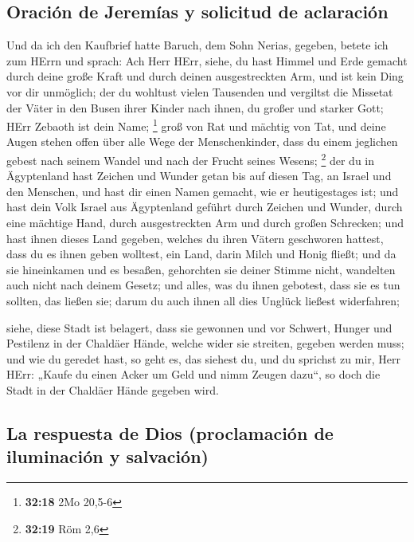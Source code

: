 \hypertarget{oraciuxf3n-de-jeremuxedas-y-solicitud-de-aclaraciuxf3n}{%
\subsection{Oración de Jeremías y solicitud de
aclaración}\label{oraciuxf3n-de-jeremuxedas-y-solicitud-de-aclaraciuxf3n}}

 Und da ich den Kaufbrief hatte Baruch, dem Sohn Nerias,
gegeben, betete ich zum HErrn und sprach:  Ach Herr HErr,
siehe, du hast Himmel und Erde gemacht durch deine große Kraft und durch
deinen ausgestreckten Arm, und ist kein Ding vor dir unmöglich;
 der du wohltust vielen Tausenden und vergiltst die
Missetat der Väter in den Busen ihrer Kinder nach ihnen, du großer und
starker Gott; HErr Zebaoth ist dein Name; \footnote{\textbf{32:18} 2Mo
  20,5-6}  groß von Rat und mächtig von Tat, und deine
Augen stehen offen über alle Wege der Menschenkinder, dass du einem
jeglichen gebest nach seinem Wandel und nach der Frucht seines Wesens;
\footnote{\textbf{32:19} Röm 2,6}  der du in Ägyptenland
hast Zeichen und Wunder getan bis auf diesen Tag, an Israel und den
Menschen, und hast dir einen Namen gemacht, wie er heutigestages ist;
 und hast dein Volk Israel aus Ägyptenland geführt durch
Zeichen und Wunder, durch eine mächtige Hand, durch ausgestreckten Arm
und durch großen Schrecken;  und hast ihnen dieses Land
gegeben, welches du ihren Vätern geschworen hattest, dass du es ihnen
geben wolltest, ein Land, darin Milch und Honig fließt; 
und da sie hineinkamen und es besaßen, gehorchten sie deiner Stimme
nicht, wandelten auch nicht nach deinem Gesetz; und alles, was du ihnen
gebotest, dass sie es tun sollten, das ließen sie; darum du auch ihnen
all dies Unglück ließest widerfahren;

 siehe, diese Stadt ist belagert, dass sie gewonnen und
vor Schwert, Hunger und Pestilenz in der Chaldäer Hände, welche wider
sie streiten, gegeben werden muss; und wie du geredet hast, so geht es,
das siehest du,  und du sprichst zu mir, Herr HErr:
„Kaufe du einen Acker um Geld und nimm Zeugen dazu``, so doch die Stadt
in der Chaldäer Hände gegeben wird.

\hypertarget{la-respuesta-de-dios-proclamaciuxf3n-de-iluminaciuxf3n-y-salvaciuxf3n}{%
\subsection{La respuesta de Dios (proclamación de iluminación y
salvación)}\label{la-respuesta-de-dios-proclamaciuxf3n-de-iluminaciuxf3n-y-salvaciuxf3n}}

